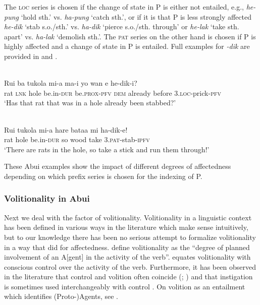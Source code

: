 The \textsc{loc} series is chosen if the change of state in P is either not entailed, e.g., \textit{he-pung} `hold sth.' vs. \textit{ha-pung} `catch sth.', or if it is that P is less strongly affected \textit{he-dik} `stab s.o./sth.' vs. \textit{ha-dik} `pierce s.o./sth. through' or \textit{he-lak} `take sth. apart' vs. \textit{ha-lak} `demolish sth.'. The \textsc{pat} series on the other hand is chosen if P is highly affected and a change of state in P is entailed. Full examples for \textit{{}-dik} are provided in  and .


\ea%
\label{bkm:Ref383697370}
 \\ 
\gll  Rui  ba  tukola  mi-a  ma-i  yo  wan  e  he-dik-i?      \\  
   rat  \textsc{lnk} hole  be.in-\textsc{dur} be.\textsc{prox-pfv} \textsc{dem}  already    before  3.\textsc{loc}{}-prick-\textsc{pfv} \\
\glt `Has that rat that was in a hole already been stabbed?'
\z
  


\ea%
\label{bkm:Ref383697375}
 \\ 
\gll   Rui  tukola  mi-a  hare  bataa    mi  ha-dik-e! \\  
    rat  hole  be.in-\textsc{dur} so  wood  take  3.\textsc{pat}{}-stab-\textsc{ipfv} \\
\glt  `There are rats in the hole, so take a stick and run them through!'
\z



 



These Abui examples show the impact of different degrees of affectedness depending on which prefix series is chosen for the indexing of P.

\subsubsection{Volitionality in Abui}
Next we deal with the factor of volitionality. Volitionality in a linguistic context has been defined in various ways in the literature which make sense intuitively, but to our knowledge there has been no serious attempt to formalize volitionality in a way that \citet{Beavers2011} did for affectedness. \citet[286]{HopperEtAl1980} define volitionality as the ``degree of planned involvement of an A[gent] in the activity of the verb''. \citet[52]{DeLancey1985} equates volitionality with conscious control over the activity of the verb. Furthermore, it has been observed in the literature that control and volition often coincide (\citealt[392]{Tsunoda1985}; \citealt[56]{DeLancey1985}) and that instigation is sometimes used interchangeably with control \citep[45]{Naess2007}. On volition as an entailment which identifies (Proto-)Agents, see \citet{Dowty1991}.

